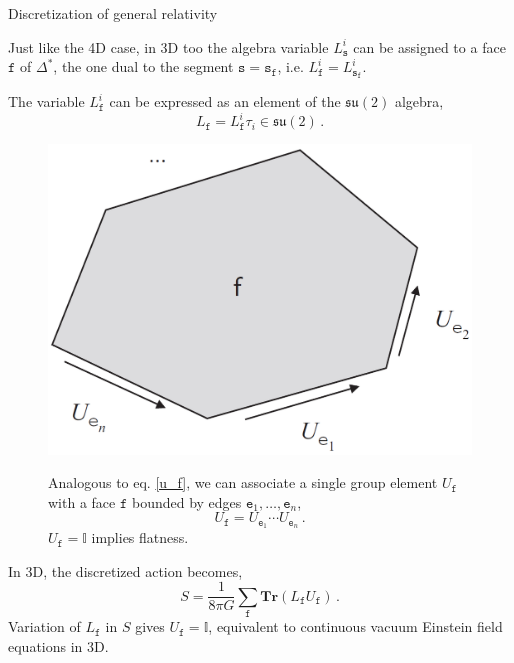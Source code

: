 \documentclass[12pt,titlepage]{article}
\begin{document}
\begin{frame}{Discretization of general relativity}
    \begin{list}{\,}{\leftmargin=1em \itemindent=0em}
        \item<1-> Just like the 4D case, in 3D too the algebra variable $L_\mathtt{s}^i$ can be assigned to a face $\mathtt{f}$ of $\Delta^\text{*}$, the one dual to the segment $\mathtt{s}=\mathtt{s_f}$, i.e. $L_\mathtt{f}^i=L_\mathtt{s_f}^i$.
        \item<2-> The variable $L_\mathtt{f}^i$ can be expressed as an element of the $\mathfrak{su}(2)$ algebra,
        \begin{equation}
            L_\mathtt{f}=L_\mathtt{f}^i \tau_i \in\mathfrak{su}(2)\,.
        \end{equation}
        \item<3-> \noindent\FloatBarrier
        \begin{figure}[!ht]
            \begin{minipage}{0.35\linewidth}
                \includegraphics[width=\linewidth]{4.10.png}
            \end{minipage}
            \begin{minipage}{0.65\linewidth}
                Analogous to eq. \ref{u_f}, we can associate a single group element $U_\mathtt{f}$ with a face $\mathtt{f}$ bounded by edges $\mathtt{e}_1,\dots,\mathtt{e}_n$,
                \begin{equation}
                    U_\mathtt{f}=U_{\mathtt{e}_1}\cdots U_{\mathtt{e}_n}\,.
                \end{equation}
                $U_\mathtt{f}=\mathbb{I}$ implies flatness.
            \end{minipage}
        \end{figure}\FloatBarrier
        \item<4-> In 3D, the discretized action becomes,
        \begin{equation}
            S=\frac{1}{8\pi G}\sum_\mathtt{f} \mathbf{Tr}(L_\mathtt{f} U_\mathtt{f})\,.
        \end{equation}
        Variation of $L_\mathtt{f}$ in $S$ gives $U_\mathtt{f}=\mathbb{I}$, equivalent to continuous vacuum Einstein field equations in 3D.
    \end{list}
\end{frame}
\end{document}
